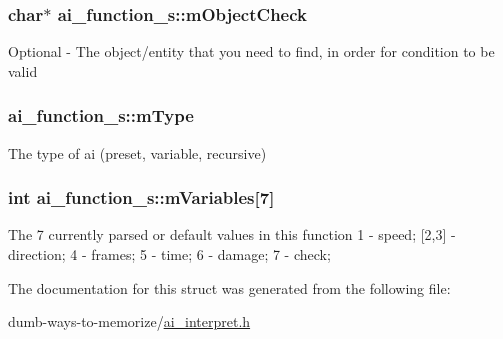 \subsubsection[{\texorpdfstring{m\+Object\+Check}{mObjectCheck}}]{\setlength{\rightskip}{0pt plus 5cm}char$\ast$ ai\+\_\+function\+\_\+s\+::m\+Object\+Check}\hypertarget{structai__function__s_a60d8dbe354717f8965d8ffbe012b0c07}{}\label{structai__function__s_a60d8dbe354717f8965d8ffbe012b0c07}
Optional -\/ The object/entity that you need to find, in order for condition to be valid 
\subsubsection[{\texorpdfstring{m\+Type}{mType}}]{ ai\+\_\+function\+\_\+s\+::m\+Type}\hypertarget{structai__function__s_a90d5d040e7fa0016b1388e456dc9bef1}{}\label{structai__function__s_a90d5d040e7fa0016b1388e456dc9bef1}
The type of ai (preset, variable, recursive) 
\subsubsection[{\texorpdfstring{m\+Variables}{mVariables}}]{\setlength{\rightskip}{0pt plus 5cm}int ai\+\_\+function\+\_\+s\+::m\+Variables\mbox{[}7\mbox{]}}\hypertarget{structai__function__s_a6469b5462335a0b31b5f9e28e24c7767}{}\label{structai__function__s_a6469b5462335a0b31b5f9e28e24c7767}
The 7 currently parsed or default values in this function 1 -\/ speed; \mbox{[}2,3\mbox{]} -\/ direction; 4 -\/ frames; 5 -\/ time; 6 -\/ damage; 7 -\/ check; 

The documentation for this struct was generated from the following file\+:\begin{DoxyCompactItemize}
\item 
dumb-\/ways-\/to-\/memorize/\hyperlink{ai__interpret_8h}{ai\+\_\+interpret.\+h}\end{DoxyCompactItemize}
